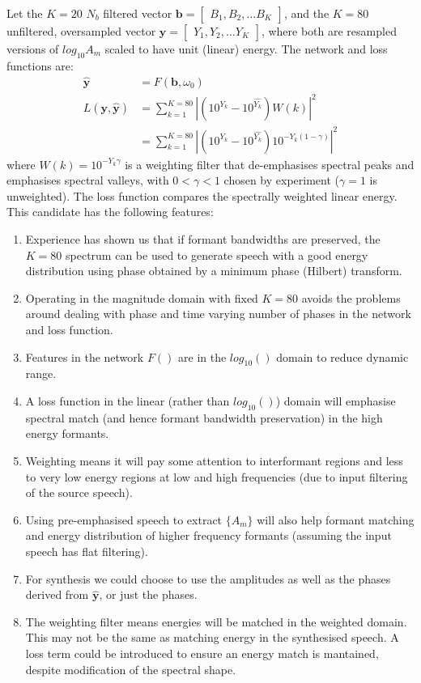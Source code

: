\documentclass{article}
\begin{document}
Let the $K=20$ $N_b$ filtered vector $\mathbf{b} = \begin{bmatrix} B_1, B_2, \ldots B_K \end{bmatrix}$, and the $K=80$ unfiltered, oversampled vector $\mathbf{y} = \begin{bmatrix} Y_1, Y_2, \ldots Y_K \end{bmatrix}$, where both are resampled versions of $log_{10}A_m$ scaled to have unit (linear) energy. The network and loss functions are:
\begin{equation}
\begin{split}
\hat{\mathbf{y}} &= F(\mathbf{b},\omega_0) \\
L(\mathbf{y},\hat{\mathbf{y}}) &= \sum_{k=1}^{K=80}|(10^{Y_k}-10^{\hat{Y_k}})W(k)|^2 \\
      &= \sum_{k=1}^{K=80}|(10^{Y_k}-10^{\hat{Y_k}})10^{-Y_k (1-\gamma)}|^2
\end{split}
\end{equation}
where $W(k)=10^{-Y_k \gamma}$ is a weighting filter that de-emphasises spectral peaks and emphasises spectral valleys, with $0<\gamma<1$ chosen by experiment ($\gamma =1$ is unweighted).  The loss function compares the spectrally weighted linear energy. This candidate has the following features:
\begin{enumerate}
\item Experience has shown us that if formant bandwidths are preserved, the $K=80$ spectrum can be used to generate speech with a good energy distribution using phase obtained by a minimum phase (Hilbert) transform.
\item Operating in the magnitude domain with fixed $K=80$ avoids the problems around dealing with phase and time varying number of phases in the network and loss function.
\item Features in the network $F()$ are in the $log_{10}()$ domain to reduce dynamic range. 
\item A loss function in the linear (rather than $log_{10}()$) domain will emphasise spectral match (and hence formant bandwidth preservation) in the high energy formants.
\item Weighting means it will pay some attention to interformant regions and less to very low energy regions at low and high frequencies (due to input filtering of the source speech).
\item Using pre-emphasised speech to extract $\{A_m\}$ will also help formant matching and energy distribution of higher frequency formants (assuming the input speech has flat filtering).
\item For synthesis we could choose to use the amplitudes as well as the phases derived from $\hat{\mathbf{y}}$, or just the phases.
\item The weighting filter means energies will be matched in the weighted domain.  This may not be the same as matching energy in the synthesised speech. A loss term could be introduced to ensure an energy match is mantained, despite modification of the spectral shape.
\end{enumerate}
\end{document}
